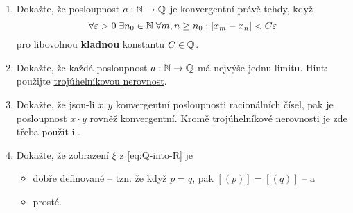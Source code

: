 \section*{}

\begin{enumerate}
 \item Dokažte, že posloupnost $a:\mathbb{N} \to \mathbb{Q}$ je konvergentní právě tehdy, když
  \[
   \forall \varepsilon>0 \; \exists n_0 \in \mathbb{N} \; \forall m,n \geq n_0: |x_m -
   x_n| < C\varepsilon
  \]
  pro libovolnou \textbf{kladnou} konstantu $C \in \mathbb{Q}$.
 \item Dokažte, že každá posloupnost $a:\mathbb{N} \to \mathbb{Q}$ má nejvýše jednu limitu.
  Hint: použijte \hyperref[lem:trojuhelnikova-nerovnost]{trojúhelníkovou
  nerovnost}.
 \item Dokažte, že jsou-li $x,y$ konvergentní posloupnosti racionálních čísel,
  pak je posloupnost $x \cdot y$ rovněž konvergentní. Kromě
  \hyperref[lem:trojuhelnikova-nerovnost]{trojúhelníkové nerovnosti} je zde
  třeba použít i .
 \item Dokažte, že zobrazení $\xi$ z \eqref{eq:Q-into-R} je
  \begin{itemize}
   \item dobře definované -- tzn. že když $p = q$, pak $[(p)] = [(q)]$ -- a
   \item prosté.
  \end{itemize}
\end{enumerate}
